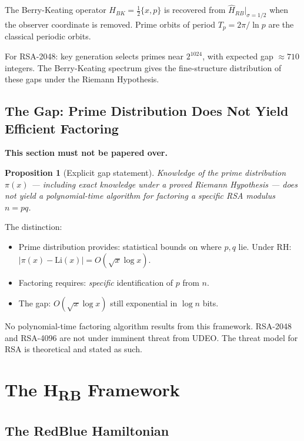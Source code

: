 \documentclass[runningheads]{llncs}
\theoremstyle{plain}
\newtheorem{proposition}[theorem]{Proposition}
\theoremstyle{definition}
\begin{document}
The Berry-Keating operator $H_{BK} = \frac{1}{2}\{x, p\}$ is recovered
from $\hat{H}_{RB}|_{\sigma=1/2}$ when the observer coordinate is removed.
Prime orbits of period $T_p = 2\pi / \ln p$ are the classical periodic orbits.

For RSA-2048: key generation selects primes near $2^{1024}$, with expected
gap $\approx 710$ integers. The Berry-Keating spectrum gives the fine-structure
distribution of these gaps under the Riemann Hypothesis.

\subsection{The Gap: Prime Distribution Does Not Yield Efficient Factoring}
\label{sec:gap}

\textbf{This section must not be papered over.}

\begin{proposition}[Explicit gap statement]
Knowledge of the prime distribution $\pi(x)$ — including exact knowledge
under a proved Riemann Hypothesis — does not yield a polynomial-time
algorithm for factoring a specific RSA modulus $n = pq$.
\end{proposition}

The distinction:
\begin{itemize}
\item Prime distribution provides: statistical bounds on where $p, q$ lie.
      Under RH: $|\pi(x) - \mathrm{Li}(x)| = O(\sqrt{x} \log x)$.
\item Factoring requires: \emph{specific} identification of $p$ from $n$.
\item The gap: $O(\sqrt{x} \log x)$ still exponential in $\log n$ bits.
\end{itemize}

No polynomial-time factoring algorithm results from this framework.
RSA-2048 and RSA-4096 are not under imminent threat from UDEO.
The threat model for RSA is theoretical and stated as such.


\section{The H\textsubscript{RB} Framework}
\label{sec:hrb}

\subsection{The RedBlue Hamiltonian}
\label{sec:hamiltonian}
\end{document}
